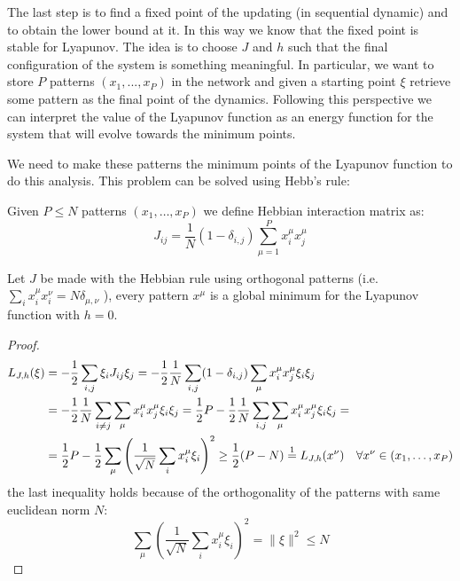 \noindent The last step is to find a fixed point of the updating (in sequential dynamic) and to obtain the lower bound at it. In this way we know that the fixed point is stable for Lyapunov. The idea is to choose $J$ and $h$ such that the final configuration of the system is something meaningful. In particular, we want to store $P$ patterns $(x_1,...,x_P)$ in the network and given a starting point $\xi$ retrieve some pattern as the final point of the dynamics. Following this perspective we can interpret the value of the Lyapunov function as an energy function for the system that will evolve towards the minimum points.

\noindent We need to make these patterns the minimum points of the Lyapunov function to do this analysis. This problem can be solved using Hebb's rule:
\begin{definition}
    \label{def:Heb}
    Given $P \leq N$ patterns $(x_1,\ldots,x_P)$ we define Hebbian interaction matrix as:
    \[
    J_{ij} = \frac1N (1 - \delta_{i,j}) \sum_{\mu=1}^P x^{\mu}_i x^{\mu}_j
    \]
\end{definition}
\begin{lemma}
   \label{lemma:Heb}
   Let $J$ be made with the Hebbian rule using orthogonal patterns (i.e. $\sum_i x^{\mu}_i x^{\nu}_i =N \delta_{\mu,\nu}$ ), every pattern $x^{\mu}$ is a global minimum for the Lyapunov function with $h=0$.
   \begin{proof}
       \begin{align*}
            L_{J,h}(\xi) &= -\frac12 \sum_{i,j} \xi_i J_{ij} \xi_j  =
            -\frac12 \frac1N \sum_{i,j} (1 - \delta_{i,j}) \sum_{\mu} x^{\mu}_i x^{\mu}_j \xi_i \xi_j \\
            &= -\frac12\frac1N \sum_{i \neq j} \sum_{\mu} x^{\mu}_i x^{\mu}_j \xi_i \xi_j =
            \frac12P  -\frac12\frac1N \sum_{i,j} \sum_{\mu} x^{\mu}_i x^{\mu}_j \xi_i \xi_j = \\
            &= \frac{1}{2}P - \frac{1}{2}\sum_{\mu} \left( \frac{1}{\sqrt{N}} \sum_i x^{\mu}_i \xi_i \right)^2 \geq \frac{1}{2}(P - N) \overset{1}{=}  L_{J,h}(x^{\nu}) \quad \forall x^{\nu} \in (x_1,\ldots,x_P)
            \end{align*}
            the last inequality holds because of the orthogonality of the patterns with same euclidean norm $N$:
            \[
            \sum_{\mu} \left( \frac{1}{\sqrt{N}} \sum_i x^{\mu}_i \xi_i \right)^2 = \|\xi\|^2 \leq N
            \]
   \end{proof}
\end{lemma}

